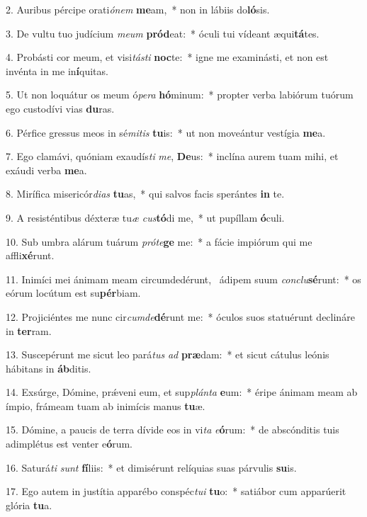 2. Auribus pércipe orati\textit{ó}\textit{nem} \textbf{me}am,~*  non in lábiis do\textbf{ló}sis.\

3. De vultu tuo judícium \textit{me}\textit{um} \textbf{pród}eat:~*  óculi tui vídeant æqui\textbf{tá}tes.\

4. Probásti cor meum, et visi\textit{tás}\textit{ti} \textbf{noc}te:~*  igne me examinásti, et non est invénta in me in\textbf{í}quitas.\

5. Ut non loquátur os meum ó\textit{pe}\textit{ra} \textbf{hó}minum:~*  propter verba labiórum tuórum ego custodívi vias \textbf{du}ras.\

6. Pérfice gressus meos in sé\textit{mi}\textit{tis} \textbf{tu}is:~*  ut non moveántur vestígia \textbf{me}a.\

7. Ego clamávi, quóniam exaudís\textit{ti} \textit{me}, \textbf{De}us:~*  inclína aurem tuam mihi, et exáudi verba \textbf{me}a.\

8. Mirífica misericór\textit{di}\textit{as} \textbf{tu}as,~*  qui salvos facis sperántes \textbf{in} te.\

9. A resisténtibus déxteræ tu\textit{æ} \textit{cus}\textbf{tó}di me,~*  ut pupíllam \textbf{ó}culi.\

10. Sub umbra alárum tuárum \textit{pró}\textit{te}\textbf{ge} me:~*  a fácie impiórum qui me affli\textbf{xé}runt.\

11. Inimíci mei ánimam meam circumdedérunt, \dag\  ádipem suum \textit{con}\textit{clu}\textbf{sé}runt:~*  os eórum locútum est su\textbf{pér}biam.\

12. Projiciéntes me nunc cir\textit{cum}\textit{de}\textbf{dé}runt me:~*  óculos suos statuérunt declináre in \textbf{ter}ram.\

13. Suscepérunt me sicut leo pará\textit{tus} \textit{ad} \textbf{præ}dam:~*  et sicut cátulus leónis hábitans in \textbf{áb}ditis.\

14. Exsúrge, Dómine, prǽveni eum, et sup\textit{plán}\textit{ta} \textbf{e}um:~*  éripe ánimam meam ab ímpio, frámeam tuam ab inimícis manus \textbf{tu}æ.\

15. Dómine, a paucis de terra dívide eos in vi\textit{ta} \textit{e}\textbf{ó}rum:~*  de abscónditis tuis adimplétus est venter e\textbf{ó}rum.\

16. Saturá\textit{ti} \textit{sunt} \textbf{fí}liis:~*  et dimisérunt relíquias suas párvulis \textbf{su}is.\

17. Ego autem in justítia apparébo conspéc\textit{tu}\textit{i} \textbf{tu}o:~*  satiábor cum apparúerit glória \textbf{tu}a.\


